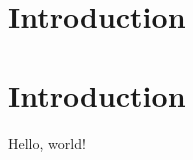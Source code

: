 \documentclass{article}
\begin{document}
\section{\textbf{Intro}duction}
\section[Intro]{\textbf{Intro}duction}


Hello, world!
\crumbs
\subcrumbs
\end{document}
